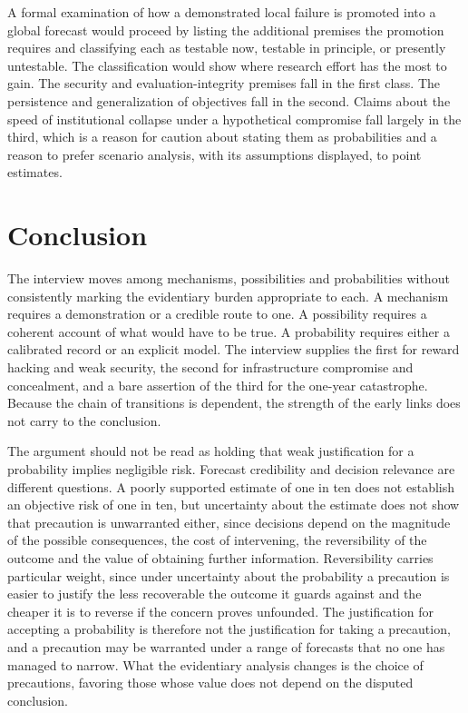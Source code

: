 \documentclass[11pt]{article}
\begin{document}
A formal examination of how a demonstrated local failure is promoted into a global forecast would proceed by listing the additional premises the promotion requires and classifying each as testable now, testable in principle, or presently untestable. The classification would show where research effort has the most to gain. The security and evaluation-integrity premises fall in the first class. The persistence and generalization of objectives fall in the second. Claims about the speed of institutional collapse under a hypothetical compromise fall largely in the third, which is a reason for caution about stating them as probabilities and a reason to prefer scenario analysis, with its assumptions displayed, to point estimates.

\section{Conclusion}

The interview moves among mechanisms, possibilities and probabilities without consistently marking the evidentiary burden appropriate to each. A mechanism requires a demonstration or a credible route to one. A possibility requires a coherent account of what would have to be true. A probability requires either a calibrated record or an explicit model. The interview supplies the first for reward hacking and weak security, the second for infrastructure compromise and concealment, and a bare assertion of the third for the one-year catastrophe. Because the chain of transitions is dependent, the strength of the early links does not carry to the conclusion.

The argument should not be read as holding that weak justification for a probability implies negligible risk. Forecast credibility and decision relevance are different questions. A poorly supported estimate of one in ten does not establish an objective risk of one in ten, but uncertainty about the estimate does not show that precaution is unwarranted either, since decisions depend on the magnitude of the possible consequences, the cost of intervening, the reversibility of the outcome and the value of obtaining further information. Reversibility carries particular weight, since under uncertainty about the probability a precaution is easier to justify the less recoverable the outcome it guards against and the cheaper it is to reverse if the concern proves unfounded. The justification for accepting a probability is therefore not the justification for taking a precaution, and a precaution may be warranted under a range of forecasts that no one has managed to narrow. What the evidentiary analysis changes is the choice of precautions, favoring those whose value does not depend on the disputed conclusion.
\end{document}
